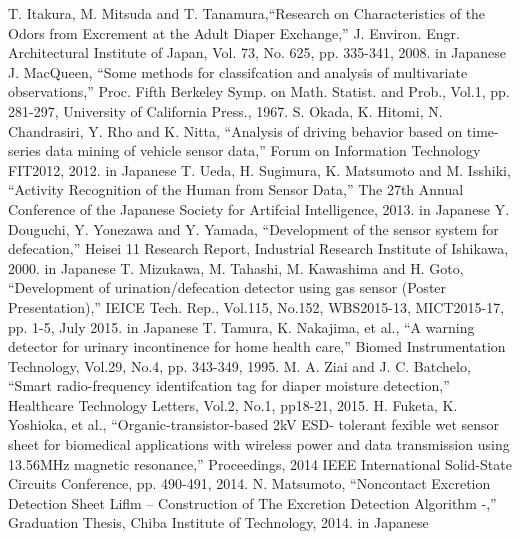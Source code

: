 \documentclass[publish,JRM,paper]{jaciiiarticle}
\begin{document}
\begin{thebibliography}{99}
 T. Itakura, M. Mitsuda and T. Tanamura,``Research on Characteristics of the Odors from Excrement at the Adult Diaper Exchange,” J. Environ. Engr. Architectural Institute of Japan, Vol. 73, No. 625, pp. 335-341, 2008. in Japanese
 J. MacQueen, ``Some methods for classifcation and analysis of multivariate observations,” Proc. Fifth Berkeley Symp. on Math. Statist. and Prob., Vol.1, pp. 281-297, University of California Press., 1967.
 S. Okada, K. Hitomi, N. Chandrasiri, Y. Rho and K. Nitta, ``Analysis of driving behavior based on time-series data mining of vehicle sensor data,” Forum on Information Technology FIT2012, 2012. in Japanese
 T. Ueda, H. Sugimura, K. Matsumoto and M. Isshiki, ``Activity Recognition of the Human from Sensor Data,” The 27th Annual Conference of the Japanese Society for Artifcial Intelligence, 2013. in Japanese
 Y. Douguchi, Y. Yonezawa and Y. Yamada, ``Development of the sensor system for defecation,” Heisei 11 Research Report, Industrial Research Institute of Ishikawa, 2000. in Japanese
 T. Mizukawa, M. Tahashi, M. Kawashima and H. Goto, ``Development of urination/defecation detector using gas sensor (Poster Presentation),” IEICE Tech. Rep., Vol.115, No.152, WBS2015-13, MICT2015-17, pp. 1-5, July 2015. in Japanese
 T. Tamura, K. Nakajima, et al., ``A warning detector for urinary incontinence for home health care,” Biomed Instrumentation Technology, Vol.29, No.4, pp. 343-349, 1995.
 M. A. Ziai and J. C. Batchelo, ``Smart radio-frequency identifcation tag for diaper moisture detection,” Healthcare Technology Letters, Vol.2, No.1, pp18-21, 2015.
 H. Fuketa, K. Yoshioka, et al., ``Organic-transistor-based 2kV ESD- tolerant fexible wet sensor sheet for biomedical applications with wireless power and data transmission using 13.56MHz magnetic resonance,” Proceedings, 2014 IEEE International Solid-State Circuits Conference, pp. 490-491, 2014.
N. Matsumoto, ``Noncontact Excretion Detection Sheet Liflm – Construction of The Excretion Detection Algorithm -,” Graduation Thesis, Chiba Institute of Technology, 2014. in Japanese
\end{thebibliography}
\end{document}
